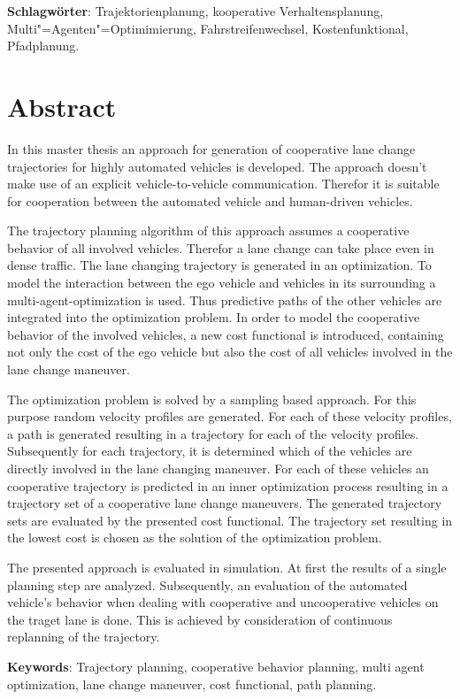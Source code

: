 \textbf{Schlagw\"orter}: Trajektorienplanung, kooperative Verhaltensplanung, Multi"=Agenten"=Optimimierung, Fahrstreifenwechsel, Kostenfunktional, Pfadplanung.



\chapter*{Abstract}
In this master thesis an approach for generation of cooperative lane change trajectories for highly automated vehicles is developed.
The approach doesn't make use of an explicit vehicle-to-vehicle communication.
Therefor it is suitable for cooperation between the automated vehicle and human-driven vehicles.

The trajectory planning algorithm of this approach assumes a cooperative behavior of all involved vehicles.
Therefor a lane change can take place even in dense traffic.
The lane changing trajectory is generated in an optimization.
To model the interaction between the ego vehicle and vehicles in its surrounding a multi-agent-optimization is used.
Thus predictive paths of the other vehicles are integrated into the optimization problem.
In order to model the cooperative behavior of the involved vehicles, a new cost functional is introduced, containing not only the cost of the ego vehicle but also the cost of all vehicles involved in the lane change maneuver.

The optimization problem is solved by a sampling based approach.
For this purpose random velocity profiles are generated.
For each of these velocity profiles, a path is generated resulting in a trajectory for each of the velocity profiles.
Subsequently for each trajectory, it is determined which of the vehicles are directly involved in the lane changing maneuver.
For each of these vehicles an cooperative trajectory is predicted in an inner optimization process resulting in a trajectory set of a cooperative lane change maneuvers.
The generated trajectory sets are evaluated by the presented cost functional. 
The trajectory set resulting in the lowest cost is chosen as the solution of the optimization problem.

The presented approach is evaluated in simulation.
At first the results of a single planning step are analyzed.
Subsequently, an evaluation of the automated vehicle's behavior when dealing with cooperative and uncooperative vehicles on the traget lane is done.
This is achieved by consideration of continuous replanning of the trajectory.



\textbf{Keywords}: Trajectory planning, cooperative behavior planning, multi agent optimization, lane change maneuver, cost functional, path planning.